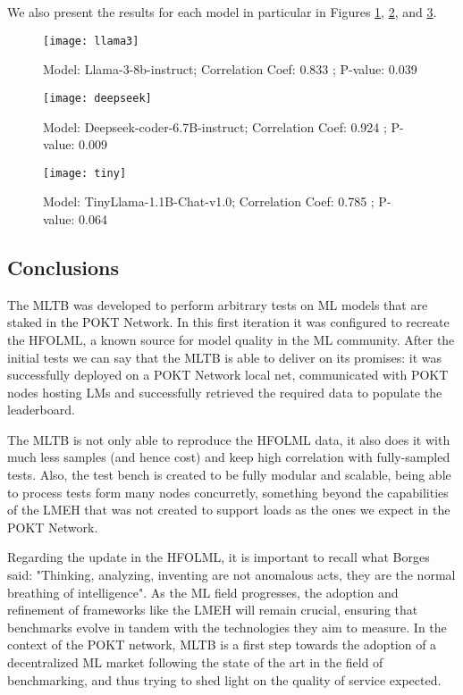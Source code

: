 We also present the results for each model in particular in Figures \ref{secb:fig:m1}, \ref{secb:fig:m2}, and \ref{secb:fig:m3}. 

\begin{figure}[htb!]
    \centering
    \texttt{[image: llama3]}
    \caption{Model: Llama-3-8b-instruct; Correlation Coef: 0.833 ; P-value: 0.039}
    \label{secb:fig:m1}
\end{figure}

\begin{figure}[htb!]
    \centering
    \texttt{[image: deepseek]}
    \caption{Model: Deepseek-coder-6.7B-instruct; Correlation Coef: 0.924 ; P-value: 0.009}
    \label{secb:fig:m2}
\end{figure}

\begin{figure}[htb!]
    \centering
    \texttt{[image: tiny]}
    \caption{Model: TinyLlama-1.1B-Chat-v1.0; Correlation Coef: 0.785 ; P-value: 0.064}
    \label{secb:fig:m3}
\end{figure}



\subsection{Conclusions}

The \gls{MLTB} was developed to perform arbitrary tests on \gls{ML} models that are staked in the POKT Network. 
In this first iteration it was configured to recreate the \gls{HFOLML}, a known source for model quality in the \gls{ML} community. 
After the initial tests we can say that the \gls{MLTB} is able to deliver on its promises: it was successfully deployed on a POKT Network local net, communicated with POKT nodes hosting \glspl{LM} and successfully retrieved the required data to populate the leaderboard. 

The \gls{MLTB} is not only able to reproduce the \gls{HFOLML} data, it also does it with much less samples (and hence cost) and keep high correlation with fully-sampled tests. 
Also, the test bench is created to be fully modular and scalable, being able to process tests form many nodes concurretly, something beyond the capabilities of the \gls{LMEH} that was not created to support loads as the ones we expect in the POKT Network. 

Regarding the update in the \gls{HFOLML}, it is important to recall what Borges said: "Thinking, analyzing, inventing are not anomalous acts, they are the normal breathing of intelligence". 
As the \gls{ML} field progresses, the adoption and refinement of frameworks like the \gls{LMEH} will remain crucial, ensuring that benchmarks evolve in tandem with the technologies they aim to measure. 
In the context of the POKT network, \gls{MLTB} is a first step towards the adoption of a decentralized \gls{ML} market following the state of the art in the field of benchmarking, and thus trying to shed light on the quality of service expected.
